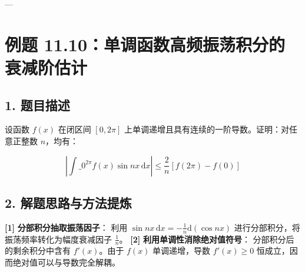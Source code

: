 \documentclass[11pt,a4paper,UTF8]{ctexart}
\begin{document}
---


\section{例题 11.10：单调函数高频振荡积分的衰减阶估计}


\subsection{1. 题目描述}
设函数 $f(x)$ 在闭区间 $[0, 2\pi]$ 上单调递增且具有连续的一阶导数。证明：对任意正整数 $n$，均有：

\begin{equation*}
\left| \int\_0^{2\pi} f(x)\sin nx\,\mathrm{d}x \right| \le \frac{2}{n} [f(2\pi) - f(0)]
\end{equation*}



\subsection{2. 解题思路与方法提炼}
\begin{solbox}[分步推导与答题规范]
\textbf{[1]}  \textbf{分部积分抽取振荡因子}：
利用 $\sin nx\,\mathrm{d}x = -\frac{1}{n}\mathrm{d}(\cos nx)$ 进行分部积分，将振荡频率转化为幅度衰减因子 $\frac{1}{n}$。
\textbf{[2]}  \textbf{利用单调性消除绝对值符号}：
分部积分后的剩余积分中含有 $f'(x)$。由于 $f(x)$ 单调递增，导数 $f'(x) \ge 0$ 恒成立，因而绝对值可以与导数完全解耦。
\end{solbox}
\end{document}
